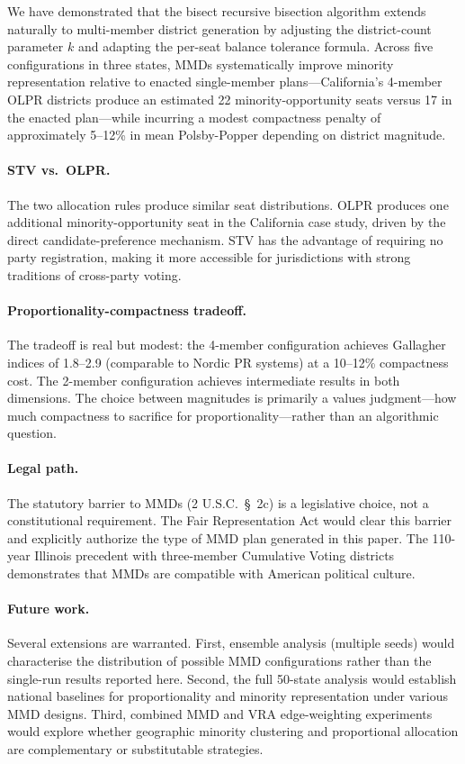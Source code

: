 We have demonstrated that the bisect recursive bisection algorithm extends
naturally to multi-member district generation by adjusting the district-count
parameter $k$ and adapting the per-seat balance tolerance formula.  Across
five configurations in three states, MMDs systematically improve minority
representation relative to enacted single-member plans---California's
4-member OLPR districts produce an estimated 22 minority-opportunity seats
versus 17 in the enacted plan---while incurring a modest compactness penalty
of approximately 5--12\% in mean Polsby-Popper depending on district
magnitude.\singrun

\paragraph{STV vs.\ OLPR.}
The two allocation rules produce similar seat distributions.  OLPR produces
one additional minority-opportunity seat in the California case study, driven
by the direct candidate-preference mechanism.  STV has the advantage of
requiring no party registration, making it more accessible for jurisdictions
with strong traditions of cross-party voting.

\paragraph{Proportionality-compactness tradeoff.}
The tradeoff is real but modest: the 4-member configuration achieves
Gallagher indices of 1.8--2.9 (comparable to Nordic PR systems) at a 10--12\%
compactness cost.  The 2-member configuration achieves intermediate results
in both dimensions.  The choice between magnitudes is primarily a values
judgment---how much compactness to sacrifice for proportionality---rather
than an algorithmic question.

\paragraph{Legal path.}
The statutory barrier to MMDs (2 U.S.C.\ \S~2c) is a legislative choice, not
a constitutional requirement.  The Fair Representation Act would clear this
barrier and explicitly authorize the type of MMD plan generated in this paper.
The 110-year Illinois precedent with three-member Cumulative Voting districts
demonstrates that MMDs are compatible with American political culture.

\paragraph{Future work.}
Several extensions are warranted.  First, ensemble analysis (multiple seeds)
would characterise the distribution of possible MMD configurations rather than
the single-run results reported here.  Second, the full 50-state analysis
would establish national baselines for proportionality and minority
representation under various MMD designs.  Third, combined MMD and VRA
edge-weighting experiments would explore whether geographic minority clustering
and proportional allocation are complementary or substitutable strategies.
